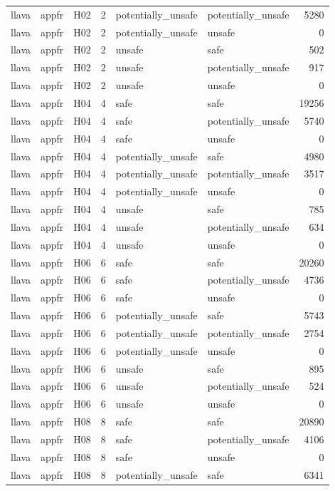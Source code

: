 \begin{table}[tbp]
\begin{tabular}{lllrllr}
llava & appfr & H02 & 2 & potentially\_unsafe & potentially\_unsafe & 5280 \\
llava & appfr & H02 & 2 & potentially\_unsafe & unsafe & 0 \\
llava & appfr & H02 & 2 & unsafe & safe & 502 \\
llava & appfr & H02 & 2 & unsafe & potentially\_unsafe & 917 \\
llava & appfr & H02 & 2 & unsafe & unsafe & 0 \\
llava & appfr & H04 & 4 & safe & safe & 19256 \\
llava & appfr & H04 & 4 & safe & potentially\_unsafe & 5740 \\
llava & appfr & H04 & 4 & safe & unsafe & 0 \\
llava & appfr & H04 & 4 & potentially\_unsafe & safe & 4980 \\
llava & appfr & H04 & 4 & potentially\_unsafe & potentially\_unsafe & 3517 \\
llava & appfr & H04 & 4 & potentially\_unsafe & unsafe & 0 \\
llava & appfr & H04 & 4 & unsafe & safe & 785 \\
llava & appfr & H04 & 4 & unsafe & potentially\_unsafe & 634 \\
llava & appfr & H04 & 4 & unsafe & unsafe & 0 \\
llava & appfr & H06 & 6 & safe & safe & 20260 \\
llava & appfr & H06 & 6 & safe & potentially\_unsafe & 4736 \\
llava & appfr & H06 & 6 & safe & unsafe & 0 \\
llava & appfr & H06 & 6 & potentially\_unsafe & safe & 5743 \\
llava & appfr & H06 & 6 & potentially\_unsafe & potentially\_unsafe & 2754 \\
llava & appfr & H06 & 6 & potentially\_unsafe & unsafe & 0 \\
llava & appfr & H06 & 6 & unsafe & safe & 895 \\
llava & appfr & H06 & 6 & unsafe & potentially\_unsafe & 524 \\
llava & appfr & H06 & 6 & unsafe & unsafe & 0 \\
llava & appfr & H08 & 8 & safe & safe & 20890 \\
llava & appfr & H08 & 8 & safe & potentially\_unsafe & 4106 \\
llava & appfr & H08 & 8 & safe & unsafe & 0 \\
llava & appfr & H08 & 8 & potentially\_unsafe & safe & 6341 \\

\end{tabular}
\end{table}
